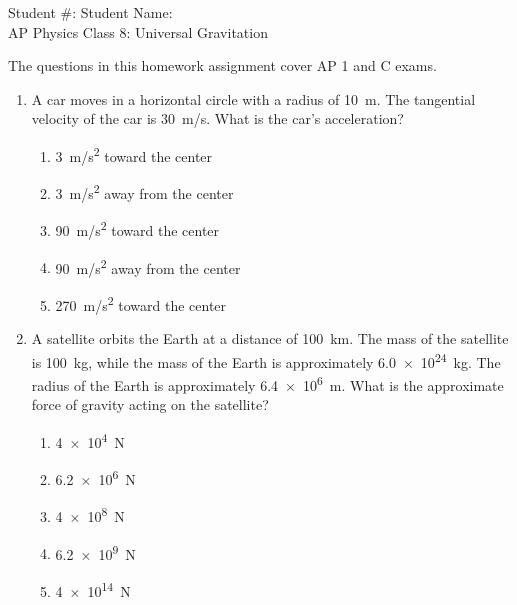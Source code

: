 \documentclass[12pt]{article}
\begin{document}
\begin{center}
  Student \#: \underline{\hspace{1in}}\hspace{1.9in}
  Student Name: \underline{\hspace{2in}}\\
  \vspace{0.3in}
  {\LARGE AP Physics \hspace{0.68in} Class 8: Universal Gravitation}
\end{center}

\noindent The questions in this homework assignment cover AP 1 and C exams.

\begin{enumerate}[leftmargin=50pt,label=\underline{\hspace{0.4in}} \arabic*.]

\item A car moves in a horizontal circle with a radius of \SI{10}{m}. The
  tangential velocity of the car is \SI{30}{m/s}. What is the car's
  acceleration?
  \begin{enumerate}[noitemsep,topsep=0pt,leftmargin=18pt]
  \item\SI{3}{m/s^2} toward the center
  \item\SI{3}{m/s^2} away from the center
  \item\SI{90}{m/s^2} toward the center
  \item\SI{90}{m/s^2} away from the center
  \item\SI{270}{m/s^2} toward the center
  \end{enumerate}
  
\item A satellite orbits the Earth at a distance of \SI{100}{km}. The mass of
  the satellite is \SI{100}{kg}, while the mass of the Earth is approximately
  \SI{6.0e24}{kg}. The radius of the Earth is approximately \SI{6.4e6}{m}. What
  is the approximate force of gravity acting on the satellite?
  \begin{enumerate}[noitemsep,topsep=0pt,leftmargin=18pt]
  \item\SI{4e4}{N}
  \item\SI{6.2e6}{N}
  \item\SI{4e8}{N}
  \item\SI{6.2e9}{N}
  \item\SI{4e14}{N}
  \end{enumerate}


\end{enumerate}
\end{document}

